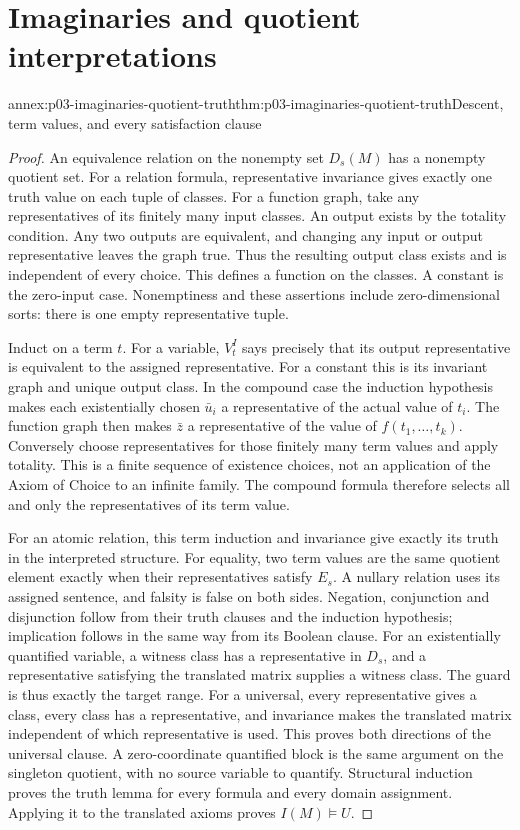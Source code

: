 \section{Imaginaries and quotient interpretations}

\begin{annexitem}{annex:p03-imaginaries-quotient-truth}{thm:p03-imaginaries-quotient-truth}{Descent, term values, and every satisfaction clause}
\begin{proof}
An equivalence relation on the nonempty set \(D_s(M)\) has a nonempty
quotient set. For a relation formula, representative invariance gives exactly
one truth value on each tuple of classes. For a function graph, take any
representatives of its finitely many input classes. An output exists by the
totality condition. Any two outputs are equivalent, and changing any input or
output representative leaves the graph true. Thus the resulting output class
exists and is independent of every choice. This defines a function on the
classes. A constant is the zero-input case. Nonemptiness and these assertions
include zero-dimensional sorts: there is one empty representative tuple.

Induct on a term \(t\). For a variable, \(V_t^I\) says precisely that
its output representative is equivalent to the assigned representative.
For a constant this is its invariant graph and unique output class. In the
compound case the induction hypothesis makes each existentially chosen
\(\bar u_i\) a representative of the actual value of \(t_i\).
The function graph then makes \(\bar z\) a representative of the value
of \(f(t_1,\ldots,t_k)\). Conversely choose representatives for those
finitely many term values and apply totality. This is a finite sequence of
existence choices, not an application of the Axiom of Choice to an infinite
family. The compound formula therefore selects all and only the representatives
of its term value.

For an atomic relation, this term induction and invariance give exactly its
truth in the interpreted structure. For equality, two term values are the
same quotient element exactly when their representatives satisfy \(E_s\).
A nullary relation uses its assigned sentence, and falsity is false on both
sides. Negation, conjunction and disjunction follow from their truth clauses
and the induction hypothesis; implication follows in the same way from its
Boolean clause. For an existentially quantified variable, a witness class has
a representative in \(D_s\), and a representative satisfying the translated
matrix supplies a witness class. The guard is thus exactly the target range.
For a universal, every representative gives a class, every class has a
representative, and invariance makes the translated matrix independent of
which representative is used. This proves both directions of the universal
clause. A zero-coordinate quantified block is the same argument on the
singleton quotient, with no source variable to quantify.
Structural induction proves the truth lemma for every formula and every domain
assignment. Applying it to the translated axioms proves \(I(M)\models U\).
\end{proof}
\end{annexitem}
